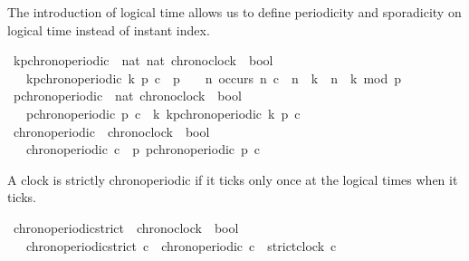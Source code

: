 \begin{isabellebody}
%
\endisatagdocument
{\isafolddocument}%
%
\isadelimdocument
%
\endisadelimdocument
%
\begin{isamarkuptext}%
The introduction of logical time allows us to define periodicity and sporadicity
on logical time instead of instant index.%
\end{isamarkuptext}\isamarkuptrue%
\isamarkupfalse%
\ kp{\isacharunderscore}chronoperiodic\ {\isacharcolon}{\isacharcolon}\ {\isacartoucheopen}{\isacharbrackleft}nat{\isacharcomma}\ nat{\isacharcomma}\ chronoclock{\isacharbrackright}\ {\isasymRightarrow}\ bool{\isacartoucheclose}\isanewline
\ \ \ {\isacartoucheopen}kp{\isacharunderscore}chronoperiodic\ k\ p\ c\ {\isasymequiv}\ {\isacharparenleft}p\ {\isachargreater}\ {}{\isacharparenright}\ {\isasymand}\ {\isacharparenleft}{\isasymforall}n{\isachardot}\ occurs\ n\ c\ {\isacharequal}\ {\isacharparenleft}{\isacharparenleft}n\ {\isasymge}\ k{\isacharparenright}\ {\isasymand}\ {\isacharparenleft}{\isacharparenleft}n\ {\isacharminus}\ k{\isacharparenright}\ mod\ p\ {\isacharequal}\ {}{\isacharparenright}{\isacharparenright}{\isacharparenright}{\isacartoucheclose}\isanewline
\isanewline
{}\isamarkupfalse%
\ p{\isacharunderscore}chronoperiodic\ {\isacharcolon}{\isacharcolon}\ {\isacartoucheopen}{\isacharbrackleft}nat{\isacharcomma}\ chronoclock{\isacharbrackright}\ {\isasymRightarrow}\ bool{\isacartoucheclose}\isanewline
\ \ \ {\isacartoucheopen}p{\isacharunderscore}chronoperiodic\ p\ c\ {\isasymequiv}\ {\isasymexists}k{\isachardot}\ kp{\isacharunderscore}chronoperiodic\ k\ p\ c{\isacartoucheclose}\isanewline
\isanewline
{}\isamarkupfalse%
\ chronoperiodic\ {\isacharcolon}{\isacharcolon}\ {\isacartoucheopen}{\isacharbrackleft}chronoclock{\isacharbrackright}\ {\isasymRightarrow}\ bool{\isacartoucheclose}\isanewline
\ \ \ {\isacartoucheopen}chronoperiodic\ c\ {\isasymequiv}\ {\isasymexists}p{\isachardot}\ p{\isacharunderscore}chronoperiodic\ p\ c{\isacartoucheclose}%
\begin{isamarkuptext}%
A clock is strictly chronoperiodic if it ticks only once at the logical times when it ticks.%
\end{isamarkuptext}\isamarkuptrue%
\isamarkupfalse%
\ chronoperiodic{\isacharunderscore}strict\ {\isacharcolon}{\isacharcolon}\ {\isacartoucheopen}{\isacharbrackleft}chronoclock{\isacharbrackright}\ {\isasymRightarrow}\ bool{\isacartoucheclose}\isanewline
\ \ \ {\isacartoucheopen}chronoperiodic{\isacharunderscore}strict\ c\ {\isasymequiv}\ chronoperiodic\ c\ {\isasymand}\ strict{\isacharunderscore}clock\ c{\isacartoucheclose}\isanewline

\end{isabellebody}
